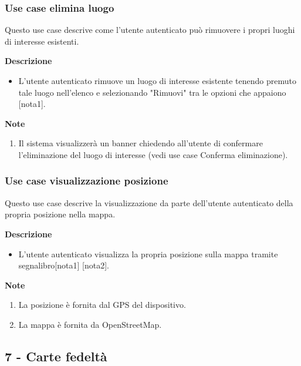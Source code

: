\documentclass[a4paper,12pt]{article}
\begin{document}
\subsubsection*{Use case elimina luogo}

Questo use case descrive come l'utente autenticato può  rimuovere  i propri luoghi di interesse esistenti.

\textbf{Descrizione}
\begin{itemize} \setlength\itemsep{0.01em}
\item L'utente autenticato rimuove un luogo di interesse esistente tenendo premuto tale luogo nell'elenco e selezionando "Rimuovi" tra le opzioni che appaiono [nota1].
\end{itemize}

\textbf{Note}
\begin{enumerate} \setlength\itemsep{0.01em}
\item Il sistema visualizzerà un banner chiedendo all'utente di confermare l'eliminazione del luogo di interesse  (vedi use case Conferma eliminazione).
\end{enumerate}



\subsubsection*{Use case visualizzazione posizione}

Questo use case descrive la visualizzazione da parte dell'utente autenticato della propria posizione nella mappa.

\textbf{Descrizione}
\begin{itemize} \setlength\itemsep{0.01em}
\item L'utente autenticato visualizza la propria posizione sulla mappa tramite segnalibro[nota1] [nota2].
\end{itemize}

\textbf{Note}
\begin{enumerate} \setlength\itemsep{0.01em}
\item La posizione è fornita dal GPS del dispositivo.
\item La mappa è fornita da OpenStreetMap.
\end{enumerate}





\subsection*{7 - Carte fedeltà}
\end{document}
